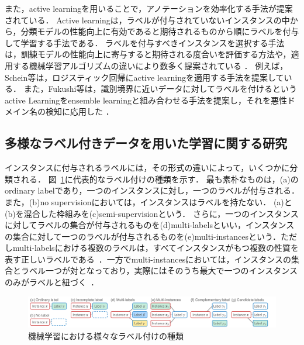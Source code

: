 \documentclass[a4paper,conference]{IEEEtran}
\begin{document}
また，active learningを用いることで，アノテーションを効率化する手法が提案されている．
Active learningは，ラベルが付与されていないインスタンスの中から，分類モデルの性能向上に有効であると期待されるものから順にラベルを付与して学習する手法である．
ラベルを付与すべきインスタンスを選択する手法は，訓練モデルの性能向上に寄与すると期待される度合いを評価する方法や，適用する機械学習アルゴリズムの違いにより数多く提案されている \cite{Settles:2009,Wang:2011}．
例えば，Schein等は，ロジスティック回帰にactive learningを適用する手法を提案している\cite{Schein:2007}．
また，Fukushi等は，識別境界に近いデータに対してラベルを付けるというactive Learningをensemble learningと組み合わせる手法を提案し，それを悪性ドメイン名の検知に応用した \cite{Fukushi:2019}．

\subsection{多様なラベル付きデータを用いた学習に関する研究}\label{related_comp-labels} 
インスタンスに付与されるラベルには，その形式の違いによって，いくつかに分類される．
図~\ref{fig:rw}に代表的なラベル付けの種類を示す．
最も素朴なものは，(a)のordinary labelであり，一つのインスタンスに対し，一つのラベルが付与される．
また，(b)no supervisionにおいては，インスタンスはラベルを持たない．
(a)と(b)を混合した枠組みを(c)semi-supervisionという．
さらに，一つのインスタンスに対してラベルの集合が付与されるものを(d)multi-labelsといい，インスタンスの集合に対して一つのラベルが付与されるものを(e)multi-instancesという．ただしmulti-labelsにおける複数のラベルは，すべてインスタンスがもつ複数の性質を表す正しいラベルである~\cite{Tsoumakas:2009}．一方でmulti-instancesにおいては，インスタンスの集合とラベル一つが対となっており，実際にはそのうち最大で一つのインスタンスのみがラベルと紐づく~\cite{Dietterich:1997}．

\begin{figure}[t]
\begin{center}
    \includegraphics[width=1.0\textwidth]{figs/graphs/rw_labels.pdf}
    \caption{機械学習における様々なラベル付けの種類}
    \label{fig:rw}
\end{center}
\end{figure}
\end{document}
